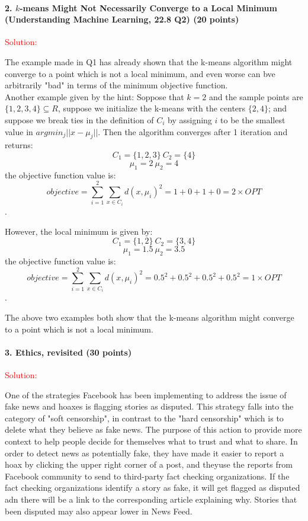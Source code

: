 \documentclass[11pt]{article} %
\begin{document}
 
\paragraph{2. $k$-means Might Not Necessarily Converge to a Local Minimum (Understanding Machine Learning, 22.8 Q2) (20 points)}

\textcolor{red}{Solution:} 

The example made in Q1 has already shown that the k-means algorithm might converge to a point which is not a local minimum, and even worse can bve arbitrarily "bad" in terms of the minimum objective function. \\

Another example given by the hint: Soppose that $k=2$ and the sample points are $\{1,2,3,4\} \subseteq R$, suppose we initialize the k-means with the centers $\{2,4\}$; and suppose we break ties in the definition of $C_i$ by assigning $i$ to be the smallest value in $argmin_j ||x-\mu_j||$. Then the algorithm converges after 1 iteration and returns: 
$$C_1=\{1,2,3\} \ C_2=\{4\}$$
$$\mu_1=2 \ \mu_2=4$$
the objective function value is: 
$$objective=\sum_{i=1}^{2} \sum_{x \in C_i} d(x, \mu_i)^2=1+0+1+0=2 \times OPT$$.

However, the local minimum is given by: 
$$C_1=\{1,2 \} \ C_2=\{3,4\}$$
$$\mu_1=1.5 \ \mu_2=3.5$$
the objective function value is: 
$$objective=\sum_{i=1}^{2} \sum_{x \in C_i} d(x, \mu_i)^2=0.5^2+0.5^2+0.5^2+0.5^2=1 \times OPT$$.

The above two examples both show that the k-means algorithm might converge to a point which is not a local minimum.
 
\paragraph{3. Ethics, revisited (30 points)} 

\textcolor{red}{Solution:} 

One of the strategies Facebook has been implementing to address the issue of fake news and hoaxes is flagging stories as disputed. This strategy falls into the category of "soft censorship", in contrast to the "hard censorship" which is to delete what they believe as fake news. The purpose of this action to provide more context to help people decide for themselves what to trust and what to share. In order to detect news as potentially fake, they have made it easier to report a hoax by clicking the upper right corner of a post, and theyuse the reports from Facebook community to send to third-party fact checking organizations. If the fact checking organizations identify a story as fake, it will get flagged as disputed adn there will be a link to the corresponding article explaining why. Stories that been disputed may also appear lower in News Feed. 
\end{document}
